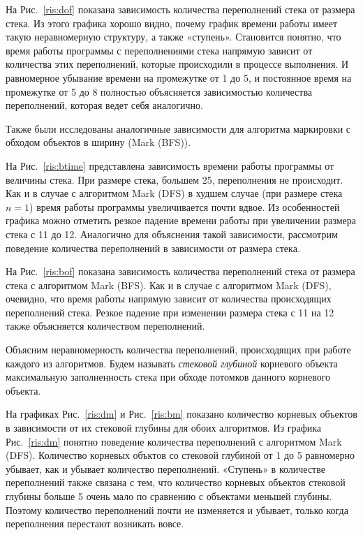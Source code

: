 На Рис.~\ref{ris:dof} показана зависимость количества переполнений стека от размера стека. Из этого графика хорошо видно, почему график времени работы имеет такую 
неравномерную структуру, а также «ступень». Становится понятно, что время работы программы с переполнениями стека напрямую зависит от количества этих переполнений,
которые происходили в процессе выполнения. И равномерное убывание времени на промежутке от 1 до 5, и постоянное время на промежутке от 5 до 8 полностью объясняется 
зависимостью количества переполнений, которая ведет себя аналогично.

Также были исследованы аналогичные зависимости для алгоритма маркировки с обходом объектов в ширину (Mark (BFS)).

На Рис.~\ref{ris:btime} представлена зависимость времени работы программы от величины стека. 
При размере стека, большем 25, переполнения не происходит. Как и в случае с алгоритмом Mark (DFS) в худшем случае (при размере стека $n = 1$) время работы программы
увеличивается почти вдвое. Из особенностей графика можно отметить резкое падение времени работы при увеличении размера стека с 11 до 12. Аналогично для объяснения 
такой зависимости, рассмотрим поведение количества переполнений в зависимости от размера стека.

На Рис.~\ref{ris:bof} показана зависимость количества переполнений стека от размера стека с алгоритмом Mark (BFS). Как и в случае с алгоритмом Mark (DFS), очевидно, 
что время работы напрямую зависит от количества происходящих переполнений стека. Резкое падение при изменении размера стека с 11 на 12 также объясняется количеством 
переполнений.

Объясним неравномерность количества переполнений, происходящих при работе каждого из алгоритмов. Будем называть {\it стековой глубиной } корневого объекта максимальную заполненность стека при обходе потомков данного 
корневого объекта.

На графиках Рис.~\ref{ris:dm} и Рис.~\ref{ris:bm} показано количество корневых объектов в зависимости от их стековой глубины для обоих алгоритмов. 
Из графика Рис.~\ref{ris:dm} понятно поведение количества переполнений с алгоритмом Mark (DFS). Количество корневых 
объктов со стековой глубиной от 1 до 5 равномерно убывает, как и убывает количество переполнений. «Ступень» в количестве переполнений также связана с тем, 
что количество корневых объектов стековой глубины больше 5 очень мало по сравнению с объектами меньшей глубины. Поэтому количество переполнений почти не изменяется и 
убывает, только когда переполнения перестают возникать вовсе.

